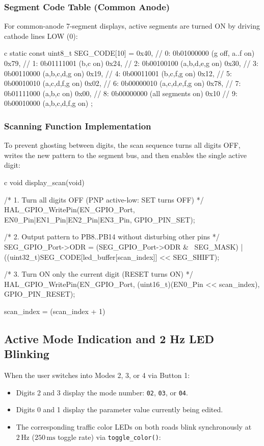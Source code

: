\documentclass{hcmut-report}
\begin{document}
\subsubsection{Segment Code Table (Common Anode)}
For common-anode 7-segment displays, active segments are turned ON by driving cathode lines LOW ($0$):
\begin{code}{c}
static const uint8_t SEG_CODE[10] = {
  0x40, // 0: 0b01000000 (g off, a..f on)
  0x79, // 1: 0b01111001 (b,c on)
  0x24, // 2: 0b00100100 (a,b,d,e,g on)
  0x30, // 3: 0b00110000 (a,b,c,d,g on)
  0x19, // 4: 0b00011001 (b,c,f,g on)
  0x12, // 5: 0b00010010 (a,c,d,f,g on)
  0x02, // 6: 0b00000010 (a,c,d,e,f,g on)
  0x78, // 7: 0b01111000 (a,b,c on)
  0x00, // 8: 0b00000000 (all segments on)
  0x10  // 9: 0b00010000 (a,b,c,d,f,g on)
};
\end{code}

\subsubsection{Scanning Function Implementation}
To prevent ghosting between digits, the scan sequence turns all digits OFF, writes the new pattern to the segment bus, and then enables the single active digit:
\begin{code}{c}
void display_scan(void)
{
  /* 1. Turn all digits OFF (PNP active-low: SET turns OFF) */
  HAL_GPIO_WritePin(EN_GPIO_Port, EN0_Pin|EN1_Pin|EN2_Pin|EN3_Pin, GPIO_PIN_SET);

  /* 2. Output pattern to PB8..PB14 without disturbing other pins */
  SEG_GPIO_Port->ODR = (SEG_GPIO_Port->ODR & ~SEG_MASK)
                     | ((uint32_t)SEG_CODE[led_buffer[scan_index]] << SEG_SHIFT);

  /* 3. Turn ON only the current digit (RESET turns ON) */
  HAL_GPIO_WritePin(EN_GPIO_Port, (uint16_t)(EN0_Pin << scan_index), GPIO_PIN_RESET);

  scan_index = (scan_index + 1) %
}
\end{code}

\subsection{Active Mode Indication and 2 Hz LED Blinking}
When the user switches into Modes 2, 3, or 4 via Button 1:
\begin{itemize}
    \item Digits 2 and 3 display the mode number: \texttt{02}, \texttt{03}, or \texttt{04}.
    \item Digits 0 and 1 display the parameter value currently being edited.
    \item The corresponding traffic color LEDs on both roads blink synchronously at $2\,\text{Hz}$ ($250\,\text{ms}$ toggle rate) via \texttt{toggle\_color()}:
\end{itemize}
\end{document}
